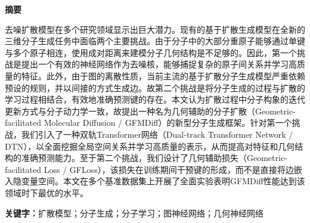 \cleardoublepage{}
\thispagestyle{previous}
\pagestyle{previous}
\setcounter{page}{1}

\clearpage
{}
\begin{center}
    \textbf{  \heiti 摘\quad 要}
\end{center}
\songti {}

去噪扩散模型在多个研究领域显示出巨大潜力。现有的基于扩散生成模型在全新的三维分子生成任务中面临两个主要挑战。由于分子中的大部分重原子能够通过单键与多个原子相连，使用成对距离来建模分子几何结构是不足够的。因此，第一个挑战是提出一个有效的神经网络作为去噪核，能够捕捉复杂的原子间关系并学习高质量的特征。此外，由于图的离散性质，当前主流的基于扩散分子生成模型严重依赖预设的规则，并以间接的方式生成边。故第二个挑战是将分子生成的过程与扩散的学习过程相结合，有效地准确预测键的存在。本文认为扩散过程中分子构象的迭代更新方式与分子动力学一致，故提出一种名为几何辅助的分子扩散（Geometric-facilitated Molecular Diffusion / GFMDiff）的新型分子生成框架。针对第一个挑战，我们引入了一种双轨Transformer网络（Dual-track Transformer Network / DTN），以全面挖掘全局空间关系并学习高质量的表示，从而提高对特征和几何结构的准确预测能力。至于第二个挑战，我们设计了几何辅助损失（Geometric-facilitated Loss / GFLoss），该损失在训练期间干预键的形成，而不是直接将边嵌入隐变量空间。本文在多个基准数据集上开展了全面实验表明GFMDiff性能达到该领域时下最优的水平。


\vspace{20pt}
\noindent \textbf{关键字：}扩散模型；分子生成；分子学习；图神经网络；几何神经网络

